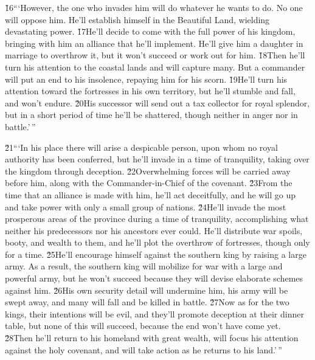 \v{16}```However, the one who invades him will do whatever he wants to do. No one will oppose him. He'll establish himself in the Beautiful Land, wielding devastating power. \v{17}He'll decide to come with the full power of his kingdom, bringing with him an alliance that he'll implement. He'll give him a daughter in marriage to overthrow it, but it won't succeed or work out for him. \v{18}Then he'll turn his attention to the coastal lands and will capture many. But a commander will put an end to his insolence, repaying him for his scorn. \v{19}He'll turn his attention toward the fortresses in his own territory, but he'll stumble and fall, and won't endure. \v{20}His successor will send out a tax collector for royal splendor, but in a short period of time he'll be shattered, though neither in anger nor in battle.'\,''

\v{21}```In his place there will arise a despicable person, upon whom no royal authority has been conferred, but he'll invade in a time of tranquility, taking over the kingdom through deception. \v{22}Overwhelming forces will be carried away before him, along with the Commander-in-Chief of the covenant. \v{23}From the time that an alliance is made with him, he'll act deceitfully, and he will go up and take power with only a small group of nations. \v{24}He'll invade the most prosperous areas of the province during a time of tranquility, accomplishing what neither his predecessors nor his ancestors ever could. He'll distribute war spoils, booty, and wealth to them, and he'll plot the overthrow of fortresses, though only for a time. \v{25}He'll encourage himself against the southern king by raising a large army. As a result, the southern king will mobilize for war with a large and powerful army, but he won't succeed because they will devise elaborate schemes against him. \v{26}His own security detail will undermine him, his army will be swept away, and many will fall and be killed in battle. \v{27}Now as for the two kings, their intentions will be evil, and they'll promote deception at their dinner table, but none of this will succeed, because the end won't have come yet. \v{28}Then he'll return to his homeland with great wealth, will focus his attention against the holy covenant, and will take action as he returns to his land.'\,''

